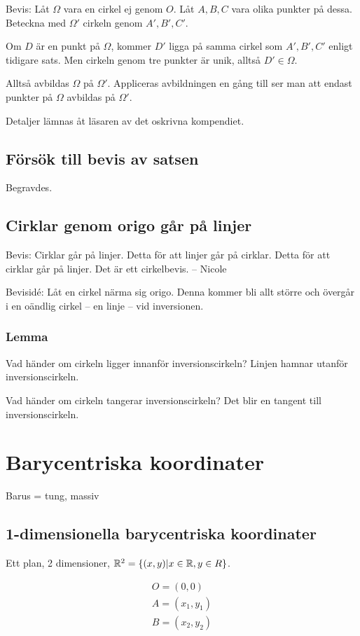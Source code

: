 \documentclass[10pt,a4paper]{article}
\begin{document}
Bevis: Låt $\Omega$ vara en cirkel ej genom $O$. 
Låt $A,B,C$ vara olika punkter på dessa.
Beteckna med $\Omega'$ cirkeln genom $A',B',C'$.

Om $D$ är en punkt på $\Omega$, kommer $D'$ ligga på samma cirkel som $A',B',C'$ enligt tidigare sats. Men cirkeln genom tre punkter är unik, alltså $D' \in \Omega$.

Alltså avbildas $\Omega$ på $\Omega'$. Appliceras avbildningen en gång till ser man att endast punkter på $\Omega$ avbildas på $\Omega'$. 

Detaljer lämnas åt läsaren av det oskrivna kompendiet.

\subsection{Försök till bevis av satsen}
Begravdes.

\subsection{Cirklar genom origo går på linjer}
Bevis: Cirklar går på linjer. Detta för att linjer går på cirklar. Detta för att cirklar går på linjer. Det är ett cirkelbevis. -- Nicole

Bevisidé:
Låt en cirkel närma sig origo. Denna kommer bli allt större och övergår i en oändlig cirkel -- en linje -- vid inversionen.

\subsubsection{Lemma}
Vad händer om cirkeln ligger innanför inversionscirkeln? Linjen hamnar utanför inversionscirkeln.

Vad händer om cirkeln tangerar inversionscirkeln? Det blir en tangent till inversionscirkeln.

\section{Barycentriska koordinater}
Barus = tung, massiv


\subsection{1-dimensionella barycentriska koordinater}
Ett plan, 2 dimensioner, $\mathbb{R}^2 = \{ (x,y) | x \in \mathbb{R}, y \in R \}$.

\begin{eqnarray*}
O = (0, 0) \\
A = (x_1, y_1) \\
B = (x_2, y_2) \\
\end{eqnarray*}
\end{document}
